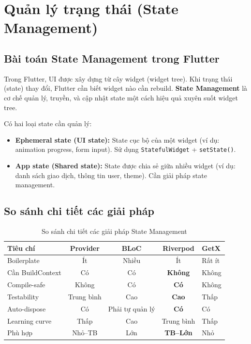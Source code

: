 \section{Quản lý trạng thái (State Management)}

\subsection{Bài toán State Management trong Flutter}

Trong Flutter, UI được xây dựng từ cây widget (widget tree). Khi trạng thái (state) thay đổi, Flutter cần biết widget nào cần rebuild. \textbf{State Management} là cơ chế quản lý, truyền, và cập nhật state một cách hiệu quả xuyên suốt widget tree.

Có hai loại state cần quản lý:
\begin{itemize}
  \item \textbf{Ephemeral state (UI state):} State cục bộ của một widget (ví dụ: animation progress, form input). Sử dụng \texttt{StatefulWidget} + \texttt{setState()}.
  \item \textbf{App state (Shared state):} State được chia sẻ giữa nhiều widget (ví dụ: danh sách giao dịch, thông tin user, theme). Cần giải pháp state management.
\end{itemize}

\subsection{So sánh chi tiết các giải pháp}

\begin{table}[H]
\centering
\caption{So sánh chi tiết các giải pháp State Management}
\label{tab:state-detail}
\begin{tabularx}{\textwidth}{|l|c|c|c|X|}
\hline
\textbf{Tiêu chí} & \textbf{Provider} & \textbf{BLoC} & \textbf{Riverpod} & \textbf{GetX} \\
\hline
Boilerplate & Ít & Nhiều & Ít & Rất ít \\
\hline
Cần BuildContext & Có & Có & \textbf{Không} & Không \\
\hline
Compile-safe & Không & Có & \textbf{Có} & Không \\
\hline
Testability & Trung bình & Cao & \textbf{Cao} & Thấp \\
\hline
Auto-dispose & Có & Phải tự quản lý & \textbf{Có} & Có \\
\hline
Learning curve & Thấp & Cao & Trung bình & Thấp \\
\hline
Phù hợp & Nhỏ--TB & Lớn & \textbf{TB--Lớn} & Nhỏ \\
\hline
\end{tabularx}
\end{table}

